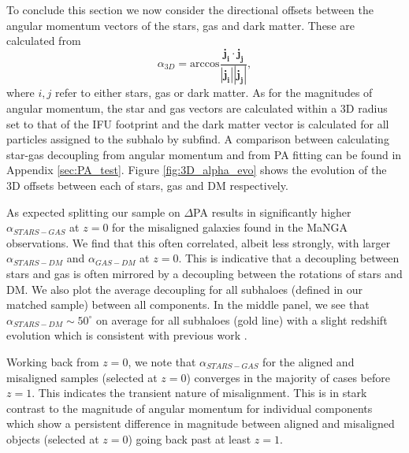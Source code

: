 \documentclass[fleqn,usenatbib]{mnras}
\begin{document}
To conclude this section we now consider the directional offsets between the angular momentum vectors of the stars, gas and dark matter. These are calculated from
\begin{equation} \label{eq:alpha}
    \alpha_{3D} = \text{arccos} \frac{\boldsymbol{j_{i}} \cdot \boldsymbol{j_{j}}}{\left| \boldsymbol{j_{i}} \right| \left| \boldsymbol{j_{j}} \right|},
\end{equation}
where $i, j$ refer to either stars, gas or dark matter. As for the magnitudes of angular momentum, the star and gas vectors are calculated within a 3D radius set to that of the IFU footprint and the dark matter vector is calculated for all particles assigned to the subhalo by subfind. A comparison between calculating star-gas decoupling from angular momentum and from PA fitting can be found in Appendix \ref{sec:PA_test}. Figure \ref{fig:3D_alpha_evo} shows the evolution of the 3D offsets between each of stars, gas and DM respectively. 

As expected splitting our sample on $\Delta$PA results in significantly higher $\alpha_{STARS - GAS}$ at $z = 0$ for the misaligned galaxies found in the MaNGA observations. We find that this often correlated, albeit less strongly, with larger $\alpha_{STARS - DM}$ and $\alpha_{GAS - DM}$ at $z=0$. This is indicative that a decoupling between stars and gas is often mirrored by a decoupling between the rotations of stars and DM. We also plot the average decoupling for all subhaloes (defined in our matched sample) between all components. In the middle panel, we see that $\alpha_{STARS - DM} \sim 50^{\circ}$ on average for all subhaloes (gold line) with a slight redshift evolution which is consistent with previous work \citep[e.g. see;][]{chisari+17}. 

Working back from $z=0$, we note that $\alpha_{STARS - GAS}$ for the aligned and misaligned samples (selected at $z=0$) converges in the majority of cases before $z=1$. This indicates the transient nature of misalignment. This is in stark contrast to the magnitude of angular momentum for individual components which show a persistent difference in magnitude between aligned and misaligned objects (selected at $z=0$) going back past at least $z=1$. 
\end{document}
